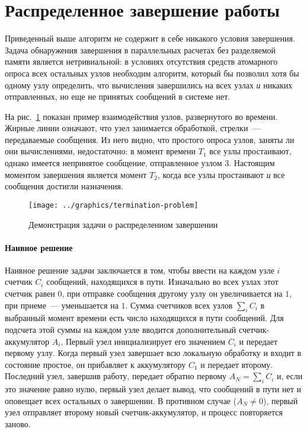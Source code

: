 \section{Распределенное завершение работы}
\label{sec:distributed-termination}

Приведенный выше алгоритм не содержит в себе никакого условия завершения. Задача
обнаружения завершения в параллельных расчетах без разделяемой памяти является
нетривиальной: в условиях отсутствия средств атомарного опроса всех остальных узлов
необходим алгоритм, который бы позволил хотя бы одному узлу определить, что вычисления
завершились на всех узлах \emph{и} никаких отправленных, но еще не принятых сообщений в
системе нет.

На рис.~\ref{fig:termination-problem} показан пример взаимодействия узлов, развернутого во
времени. Жирные линии означают, что узел занимается обработкой, стрелки~--- передаваемые
сообщения. Из него видно, что простого опроса узлов, заняты ли они вычислениями,
недостаточно: в момент времени $T_1$ все узлы простаивают, однако имеется непринятое
сообщение, отправленное узлом 3. Настоящим моментом завершения является момент $T_2$,
когда все узлы простаивают \emph{и} все сообщения достигли назначения.

\begin{figure}[htb]
  \centering
  \texttt{[image: ../graphics/termination-problem]}  
  \caption{Демонстрация задачи о распределенном завершении}
\label{fig:termination-problem}
\end{figure}

\paragraph{Наивное решение}
\label{sec:distr-term-dijkstra}

Наивное решение задачи заключается в том, чтобы ввести на каждом узле $i$ счетчик $C_i$
сообщений, находящихся в пути. Изначально во всех узлах этот счетчик равен $0$, при
отправке сообщения другому узлу он увеличивается на $1$, при приеме~--- уменьшается на
$1$. Сумма счетчиков всех узлов $\sum_iC_i$ в выбранный момент времени есть число
находящихся в пути сообщений. Для подсчета этой суммы на каждом узле вводится
дополнительный счетчик-аккумулятор $A_i$. Первый узел инициализирует его значением $C_i$ и
передает первому узлу. Когда первый узел завершает всю локальную обработку и входит в
состояние простое, он прибавляет к аккумулятору $C_1$ и передает второму\etc. Последний
узел, завершив работу, передает обратно первому $A_N = \sum_iC_i$ и, если это значение
равно нулю, первый узел делает вывод, что сообщений в пути нет и оповещает всех остальных
о завершении. В противном случае ($A_N \neq 0$), первый узел отправляет второму новый
счетчик-аккумулятор, и процесс повторяется заново.

